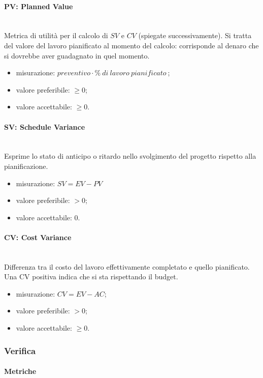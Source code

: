 			\paragraph*{PV: Planned Value}\mbox{}\\
			Metrica di utilità per il calcolo di $SV$ e $CV$ (spiegate successivamente). Si tratta del valore del lavoro pianificato al momento del calcolo: corrisponde al denaro che si dovrebbe aver guadagnato in quel momento.
			\begin{itemize}
				\item  misurazione: $preventivo \cdot \%\ di\ lavoro\ pianificato\ $;
				\item  valore preferibile: $ \geq 0$;
				\item  valore accettabile: $ \geq 0$.
			\end{itemize}			
			\paragraph*{SV: Schedule Variance}\mbox{}\\
			Esprime lo stato di anticipo o ritardo nello svolgimento del progetto rispetto alla pianificazione.
			\begin{itemize}
				\item misurazione: $SV = EV - PV$
				\item valore preferibile: $ > 0$;
				\item valore accettabile: 0.
			\end{itemize}
			\paragraph*{CV: Cost Variance}\mbox{}\\
			Differenza tra il costo del lavoro effettivamente completato e quello pianificato. Una CV positiva indica che si sta rispettando il budget.
			\begin{itemize}
				\item misurazione: $CV = EV - AC$;
				\item valore preferibile: $ > 0$;
				\item valore accettabile: $ \geq 0$.
			\end{itemize}

	\subsubsection{Verifica}
		\paragraph{Metriche}
